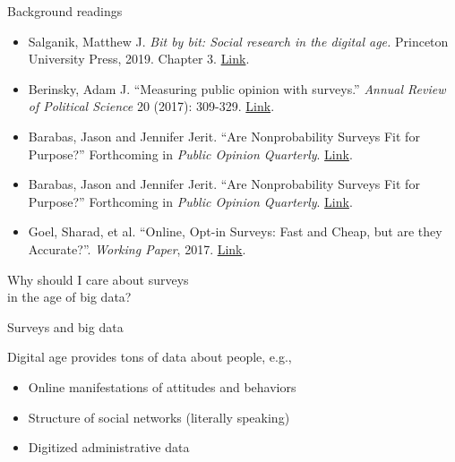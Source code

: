 \documentclass[aspectratio=169]{beamer}
\begin{document}
\begin{frame}{Background readings}

\begin{itemize}
\item Salganik, Matthew J. \textit{Bit by bit: Social research in the digital age.} Princeton University Press, 2019. Chapter 3. 
\href{https://www.bitbybitbook.com/en/1st-ed/asking-questions}{Link}.
\item Berinsky, Adam J. ``Measuring public opinion with surveys.'' \textit{Annual Review of Political Science} 20 (2017): 309-329. \href{https://www.annualreviews.org/doi/abs/10.1146/annurev-polisci-101513-113724}{Link}.
\item Barabas, Jason and Jennifer Jerit. ``Are Nonprobability Surveys Fit for Purpose?'' Forthcoming in \textit{Public Opinion Quarterly}. \href{https://bpb-us-e1.wpmucdn.com/sites.dartmouth.edu/dist/d/2388/files/2023/05/JeritBarabas_NPS_Mar2023-1.pdf}{Link}.
\item Barabas, Jason and Jennifer Jerit. ``Are Nonprobability Surveys Fit for Purpose?'' Forthcoming in \textit{Public Opinion Quarterly}. \href{https://bpb-us-e1.wpmucdn.com/sites.dartmouth.edu/dist/d/2388/files/2023/05/JeritBarabas_NPS_Mar2023-1.pdf}{Link}.
\item Goel, Sharad, et al. ``Online, Opt-in Surveys: Fast and Cheap, but are they Accurate?''. \textit{Working Paper}, 2017. \href{https://5harad.com/papers/dirtysurveys.pdf}{Link}.

\end{itemize}

\end{frame}
\begin{frame}

\begin{center}
\LARGE{Why should I care about surveys\\in the age of big data?}
\end{center}

\end{frame}
\begin{frame}{Surveys and big data}

Digital age provides tons of data about people, e.g., 
\begin{itemize}
\item Online manifestations of attitudes and behaviors
\pause
\item Structure of social networks (literally speaking)
\pause
\item Digitized administrative data 
\end{itemize}

\end{frame}
\end{document}
